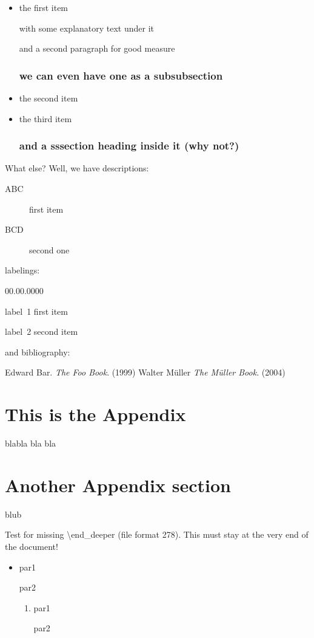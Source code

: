 \documentclass[legalpaper]{article}
\begin{document}
\begin{itemize}
\item the first item

with some explanatory text under it

and a second paragraph for good measure

\subsubsection*{we can even have one as a subsubsection}

\item the second item

\item the third item

\subsubsection*{and a sssection heading inside it (why not?)}
\end{itemize}

What else? Well, we have descriptions:
\begin{description}
\item[ABC] first item
\item[BCD] second one
\end{description}
labelings:
\begin{lyxlist}{00.00.0000}
\item [label~1] first item
\item [label~2] second item
\end{lyxlist}
and bibliography:
\begin{thebibliography}{9}
 Edward Bar. \emph{The Foo Book}. (1999)
 Walter Müller \emph{The Müller Book}. (2004) 
\end{thebibliography}

\appendix

\section{This is the Appendix}

\noindent blabla bla bla


\section{Another Appendix section}

blub

Test for missing \textbackslash end\_deeper (file format 278).
This must stay at the very end of the document!
\begin{itemize}
\item par1

par2
\begin{enumerate}
\item par1

par2
\end{enumerate}

\end{itemize}
\end{document}
